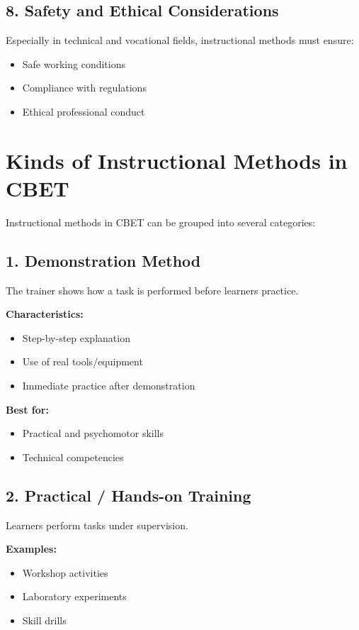 \documentclass[12pt,a4paper]{article}
\begin{document}
\subsection*{8. Safety and Ethical Considerations}
Especially in technical and vocational fields, instructional methods must ensure:
\begin{itemize}
    \item Safe working conditions
    \item Compliance with regulations
    \item Ethical professional conduct
\end{itemize}

\section*{Kinds of Instructional Methods in CBET}
Instructional methods in CBET can be grouped into several categories:

\subsection*{1. Demonstration Method}
The trainer shows how a task is performed before learners practice.

\textbf{Characteristics:}
\begin{itemize}
    \item Step-by-step explanation
    \item Use of real tools/equipment
    \item Immediate practice after demonstration
\end{itemize}

\textbf{Best for:}
\begin{itemize}
    \item Practical and psychomotor skills
    \item Technical competencies
\end{itemize}

\subsection*{2. Practical / Hands-on Training}
Learners perform tasks under supervision.

\textbf{Examples:}
\begin{itemize}
    \item Workshop activities
    \item Laboratory experiments
    \item Skill drills
\end{itemize}
\end{document}
